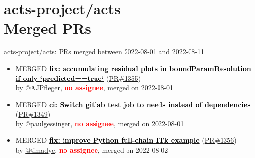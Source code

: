 \providecommand{\prmerged}{MERGED }
\providecommand{\propen}{OPEN }
\providecommand{\prwip}{WIP }
\providecommand{\prstale}{STALE }
\providecommand{\iss}{}
    









\section{ acts-project/acts \\ Merged PRs}
\begin{frame}[allowframebreaks]{ acts-project/acts: PRs merged 
between 2022-08-01 and 2022-08-11
}

  \begin{itemize}
    
    \item\prmerged
    \hspace*{0.1em}
    \textbf{\href{https://github.com/acts-project/acts/pull/1355}{\textcolor{black}{fix: accumulating residual plots in boundParamResolution if only `predicted==true`}}}
    (\href{https://github.com/acts-project/acts/pull/1355}{PR\#1355}) \\
    by \href{https://github.com/AJPfleger}{@AJPfleger}, {}\textbf{\textcolor{Red}{no assignee}}, merged on 2022-08-01

    \item\prmerged
    \hspace*{0.1em}
    \textbf{\href{https://github.com/acts-project/acts/pull/1349}{\textcolor{black}{ci: Switch gitlab test job to needs instead of dependencies}}}
    (\href{https://github.com/acts-project/acts/pull/1349}{PR\#1349}) \\
    by \href{https://github.com/paulgessinger}{@paulgessinger}, {}\textbf{\textcolor{Red}{no assignee}}, merged on 2022-08-01

    \item\prmerged
    \hspace*{0.1em}
    \textbf{\href{https://github.com/acts-project/acts/pull/1356}{\textcolor{black}{fix: improve Python full-chain ITk example}}}
    (\href{https://github.com/acts-project/acts/pull/1356}{PR\#1356}) \\
    by \href{https://github.com/timadye}{@timadye}, {}\textbf{\textcolor{Red}{no assignee}}, merged on 2022-08-02


\end{itemize}
\end{frame}
